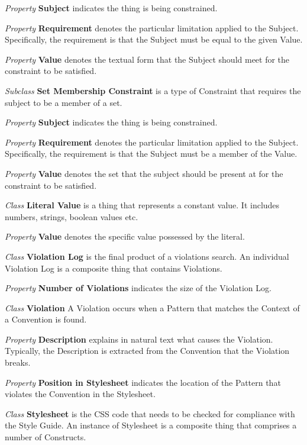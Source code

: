 \begin{description}
\textit{Property} \textbf{Subject} indicates the thing is being constrained.

\textit{Property} \textbf{Requirement} denotes the particular limitation applied to the Subject. Specifically, the requirement is that the Subject must be equal to the given Value.

\textit{Property} \textbf{Value} denotes the textual form that the Subject should meet for the constraint to be satisfied.


\item\textit{Subclass} \textbf{Set Membership Constraint} is a type of Constraint that requires the subject to be a member of a set.

\textit{Property} \textbf{Subject} indicates the thing is being constrained.

\textit{Property} \textbf{Requirement} denotes the particular limitation applied to the Subject. Specifically, the requirement is that the Subject must be a member of the Value.

\textit{Property} \textbf{Value} denotes the set that the subject should be present at for the constraint to be satisfied.


\item\textit{Class} \textbf{Literal Value} is a thing that represents a constant value. It includes numbers, strings, boolean values etc.

\textit{Property} \textbf{Value} denotes the specific value possessed by the literal.


\item\textit{Class} \textbf{Violation Log} is the final product of a violations search. An individual Violation Log is a composite thing that contains Violations.

\textit{Property} \textbf{Number of Violations} indicates the size of the Violation Log. 


\item\textit{Class} \textbf{Violation} A Violation occurs when a Pattern that matches the Context of a Convention is found.

\textit{Property} \textbf{Description} explains in natural text what causes the Violation. Typically, the Description is extracted from the Convention that the Violation breaks.

\textit{Property} \textbf{Position in Stylesheet} indicates the location of the Pattern that violates the Convention in the Stylesheet. 


\item\textit{Class} \textbf{Stylesheet} is the CSS code that needs to be checked for compliance with the Style Guide. An instance of Stylesheet is a composite thing that comprises a number of Constructs.


\end{description}
